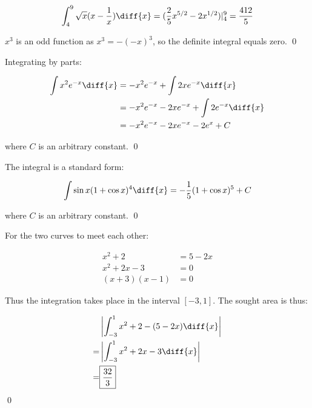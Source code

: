 \documentclass[12pt]{article}
\begin{document}
\begin{equation}
    \int_{4}^{9} \sqrt{x}(x - \frac{1}{x}) \diff{x} = (\frac{2}{5} x^{5/2} - 2 x^{1/2}) \rvert_{4}^{9} = \frac{412}{5}
\end{equation}

$x^{3}$ is an odd function as $x^{3} = -(-x)^{3}$, so the definite integral equals zero.
\qed


Integrating by parts:

\begin{equation}
    \begin{split}
        \int x^{2} e^{-x} \diff{x} &= - x^{2} e^{-x} + \int 2x e^{-x} \diff{x} \\
        &= - x^{2} e^{-x} - 2x e^{-x} + \int 2e^{-x} \diff{x} \\
        &= - x^{2} e^{-x} - 2x e^{-x} - 2e^{x} + C
    \end{split}
\end{equation}

where $C$ is an arbitrary constant.
\qed


The integral is a standard form:

\begin{equation}
    \int \sin{x} (1+\cos{x})^{4} \diff{x} = -\frac{1}{5} (1 + \cos{x})^{5} + C
\end{equation}

where $C$ is an arbitrary constant.
\qed


For the two curves to meet each other:

\begin{equation}
    \begin{split}
        x^{2} + 2 &= 5 - 2x \\
        x^{2} + 2x - 3 &= 0 \\
        (x + 3)(x - 1) &= 0
    \end{split}
\end{equation}

Thus the integration takes place in the interval $[-3, 1]$. The sought area is thus:

\begin{equation}
    \begin{split}
        &\left\lvert \int_{-3}^{1} x^2 + 2 - (5 - 2x) \diff{x} \right\rvert \\
        =&\left\lvert \int_{-3}^{1} x^{2} + 2x - 3 \diff{x} \right\rvert \\
        =&\boxed{\frac{32}{3}}
    \end{split}
\end{equation}
\qed
\end{document}
